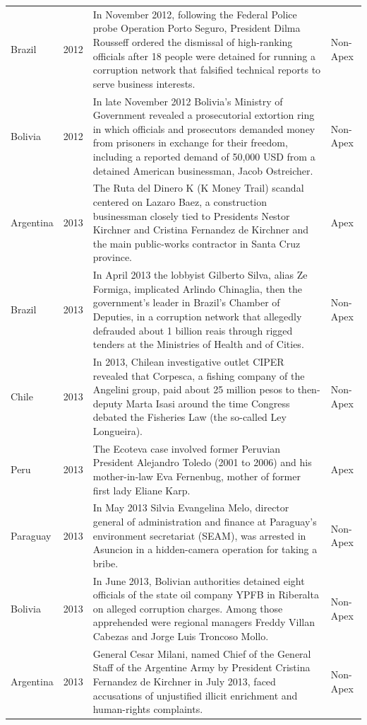 \begin{landscape}
\begin{longtable}{@{}l c p{15.5cm} l@{}}
Brazil & 2012 & In November 2012, following the Federal Police probe Operation Porto Seguro, President Dilma Rousseff ordered the dismissal of high-ranking officials after 18 people were detained for running a corruption network that falsified technical reports to serve business interests. & Non-Apex \\
Bolivia & 2012 & In late November 2012 Bolivia's Ministry of Government revealed a prosecutorial extortion ring in which officials and prosecutors demanded money from prisoners in exchange for their freedom, including a reported demand of 50,000 USD from a detained American businessman, Jacob Ostreicher. & Non-Apex \\
Argentina & 2013 & The Ruta del Dinero K (K Money Trail) scandal centered on Lazaro Baez, a construction businessman closely tied to Presidents Nestor Kirchner and Cristina Fernandez de Kirchner and the main public-works contractor in Santa Cruz province. & Apex \\
Brazil & 2013 & In April 2013 the lobbyist Gilberto Silva, alias Ze Formiga, implicated Arlindo Chinaglia, then the government's leader in Brazil's Chamber of Deputies, in a corruption network that allegedly defrauded about 1 billion reais through rigged tenders at the Ministries of Health and of Cities. & Non-Apex \\
Chile & 2013 & In 2013, Chilean investigative outlet CIPER revealed that Corpesca, a fishing company of the Angelini group, paid about 25 million pesos to then-deputy Marta Isasi around the time Congress debated the Fisheries Law (the so-called Ley Longueira). & Non-Apex \\
Peru & 2013 & The Ecoteva case involved former Peruvian President Alejandro Toledo (2001 to 2006) and his mother-in-law Eva Fernenbug, mother of former first lady Eliane Karp. & Apex \\
Paraguay & 2013 & In May 2013 Silvia Evangelina Melo, director general of administration and finance at Paraguay's environment secretariat (SEAM), was arrested in Asuncion in a hidden-camera operation for taking a bribe. & Non-Apex \\
Bolivia & 2013 & In June 2013, Bolivian authorities detained eight officials of the state oil company YPFB in Riberalta on alleged corruption charges. Among those apprehended were regional managers Freddy Villan Cabezas and Jorge Luis Troncoso Mollo. & Non-Apex \\
Argentina & 2013 & General Cesar Milani, named Chief of the General Staff of the Argentine Army by President Cristina Fernandez de Kirchner in July 2013, faced accusations of unjustified illicit enrichment and human-rights complaints. & Non-Apex \\

\end{longtable}
\end{landscape}
